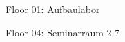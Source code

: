 \documentclass[a4paper]{article}
\begin{document}
\begin{center}
\begin{vsltext}{1.6cm}{2cm}

   \vspace{2.5cm}

    Floor 01: Aufbaulabor\\
    
    \vspace{1cm}

    Floor 04: Seminarraum 2-7\\
\end{vsltext}

\end{center}
\end{document}
